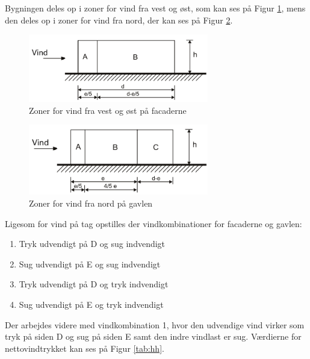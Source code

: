 Bygningen deles op i zoner for vind fra vest og øst, som kan ses på Figur \ref{fig:ab}, mens den deles op i zoner for vind fra nord, der kan ses på Figur \ref{fig:ac}.

\begin{figure}[htbp]
	\centering
	\includegraphics[width=0.7\textwidth]{billeder/vestost.png}
	\caption{Zoner for vind fra vest og øst på facaderne}
	\label{fig:ab}
\end{figure}

\begin{figure}[htbp]
	\centering
	\includegraphics[width=0.7\textwidth]{billeder/nord.png}
	\caption{Zoner for vind fra nord på gavlen}
	\label{fig:ac}
\end{figure}

Ligesom for vind på tag opstilles der vindkombinationer for facaderne og gavlen:
\begin{enumerate}
	\item Tryk udvendigt på D og sug indvendigt
	\item Sug udvendigt på E og sug indvendigt
	\item Tryk udvendigt på D og tryk indvendigt  
	\item Sug udvendigt på E og tryk indvendigt
\end{enumerate}

Der arbejdes videre med vindkombination 1, hvor den udvendige vind virker som tryk på siden D og sug på siden E samt den indre vindlast er sug.
\newline \indent{     }  Værdierne for nettovindtrykket kan ses på Figur \ref{tab:hh}.

